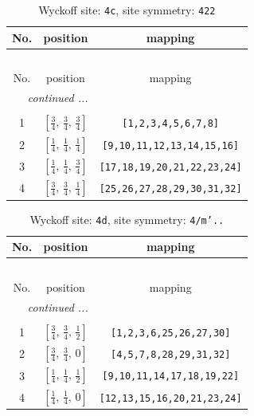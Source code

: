 \documentclass[fleqn,8pt]{jsarticle}
\begin{document}
\renewcommand{\arraystretch}{1.2}
\begin{longtable}{ccc}
\caption{Wyckoff site: {\tt 4c}, site symmetry: {\tt 422}}
 \\
 \hline \hline
No. & position & mapping \\ \hline \endfirsthead

\multicolumn{2}{l}{\tablename\ \thetable{}} \\
 \hline \hline
No. & position & mapping \\ \hline \endhead

 \hline \hline
\multicolumn{2}{r}{\footnotesize\it continued ...} \\ \endfoot

 \hline \hline
\multicolumn{2}{r}{} \\ \endlastfoot

1 & $\left[ \frac{3}{4},\, \frac{3}{4},\, \frac{3}{4} \right]$ & {\tt [1,2,3,4,5,6,7,8]} \\ \hline
2 & $\left[ \frac{1}{4},\, \frac{1}{4},\, \frac{1}{4} \right]$ & {\tt [9,10,11,12,13,14,15,16]} \\ \hline
3 & $\left[ \frac{1}{4},\, \frac{1}{4},\, \frac{3}{4} \right]$ & {\tt [17,18,19,20,21,22,23,24]} \\ \hline
4 & $\left[ \frac{3}{4},\, \frac{3}{4},\, \frac{1}{4} \right]$ & {\tt [25,26,27,28,29,30,31,32]} \\
\end{longtable}
\renewcommand{\arraystretch}{1.2}
\begin{longtable}{ccc}
\caption{Wyckoff site: {\tt 4d}, site symmetry: {\tt 4/m'..}}
 \\
 \hline \hline
No. & position & mapping \\ \hline \endfirsthead

\multicolumn{2}{l}{\tablename\ \thetable{}} \\
 \hline \hline
No. & position & mapping \\ \hline \endhead

 \hline \hline
\multicolumn{2}{r}{\footnotesize\it continued ...} \\ \endfoot

 \hline \hline
\multicolumn{2}{r}{} \\ \endlastfoot

1 & $\left[ \frac{3}{4},\, \frac{3}{4},\, \frac{1}{2} \right]$ & {\tt [1,2,3,6,25,26,27,30]} \\ \hline
2 & $\left[ \frac{3}{4},\, \frac{3}{4},\, 0 \right]$ & {\tt [4,5,7,8,28,29,31,32]} \\ \hline
3 & $\left[ \frac{1}{4},\, \frac{1}{4},\, \frac{1}{2} \right]$ & {\tt [9,10,11,14,17,18,19,22]} \\ \hline
4 & $\left[ \frac{1}{4},\, \frac{1}{4},\, 0 \right]$ & {\tt [12,13,15,16,20,21,23,24]} \\
\end{longtable}
\end{document}
